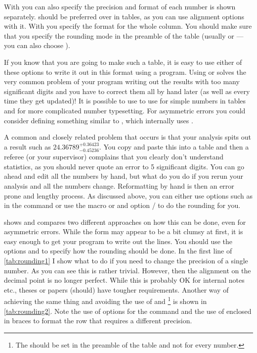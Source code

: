 With  you can also specify the precision and format of each
number is shown separately.
 should be preferred over  in tables,
as you can use alignment options with it.
With  you specify the format for the whole column.
You should make sure
that you specify the rounding mode in the preamble of the table (usually
 or  --- you can also choose ).

If you know that you are going to make such a table, it is easy
to use either of these options to write it out in this format using a program. 
Using  or  solves the very common problem of your
program writing out the results with too many significant digits and
you have to correct them all by hand later (as well as every time they
get updated)!  
It is possible to use to use  for simple numbers in tables
and  for more complicated number typesetting. 
For asymmetric errors you could
consider defining something similar to , which
internally uses .

A common and closely related problem that occurs is that your analysis
spits out a result such as \(24.36789^{+0.36423}_{-0.45236}\). You copy
and paste this into a table and then a referee (or your supervisor)
complains that you clearly don't understand statistics, as you should
never quote an error to 5 significant digits. You can go ahead and
edit all the numbers by hand, but what do you do if you rerun your
analysis and all the numbers change.
Reformatting by hand is then an error prone and lengthy process.
As discussed above, you can either use options such as 
 in the  command or use the macro
 or  
and option / to do the
rounding for you.

 shows and compares two different approaches
on how this can be done, even for asymmetric errors.
While the form
may appear to be a bit clumsy at first, it is easy enough to get your
program to write out the lines. 
You should use the options  and
 to specify how the rounding should be done.
In the first line of \cref{tab:rounding1}
I show what to do if you need to change the precision of a single number.
As you can see this is rather trivial.
However, then the alignment on the decimal point is no longer perfect.
While this is probably OK for internal notes etc.,
theses or papers (should) have tougher requirements.
Another way of achieving the same thing and
avoiding the use of  and
\footnote{%
  The  should be set in the preamble of the table and
  not for every number.}
is shown in \cref{tab:rounding2}.
Note the use of options for the  command
and the use of  enclosed in braces
to format the row that requires a different precision.

